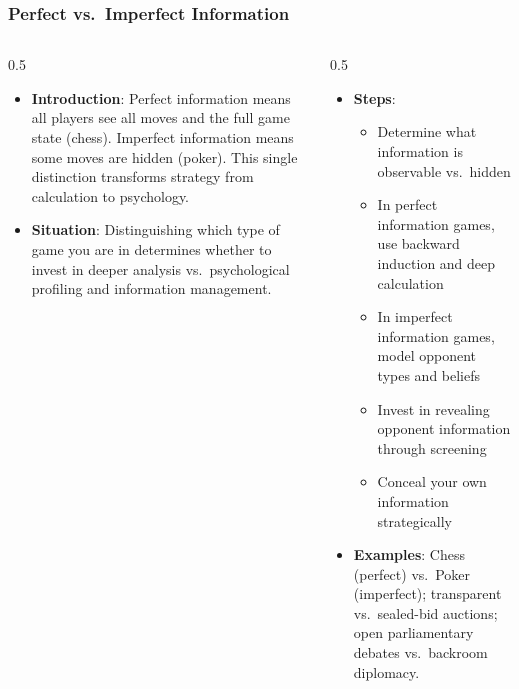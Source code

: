 \begin{frame}[fragile]\frametitle{Perfect vs.\ Imperfect Information}
\begin{columns}
    \begin{column}[T]{0.5\linewidth}
      \begin{itemize}
        \item \textbf{Introduction}: Perfect information means all players see all moves and the full game state (chess). Imperfect information means some moves are hidden (poker). This single distinction transforms strategy from calculation to psychology.
        \item \textbf{Situation}: Distinguishing which type of game you are in determines whether to invest in deeper analysis vs.\ psychological profiling and information management.
      \end{itemize}
    \end{column}
    \begin{column}[T]{0.5\linewidth}
      \begin{itemize}
        \item \textbf{Steps}:
        \begin{itemize}
          \item Determine what information is observable vs.\ hidden
          \item In perfect information games, use backward induction and deep calculation
          \item In imperfect information games, model opponent types and beliefs
          \item Invest in revealing opponent information through screening
          \item Conceal your own information strategically
        \end{itemize}\item \textbf{Examples}: Chess (perfect) vs.\ Poker (imperfect); transparent vs.\ sealed-bid auctions; open parliamentary debates vs.\ backroom diplomacy.
      \end{itemize}
    \end{column}
  \end{columns}
\end{frame}

